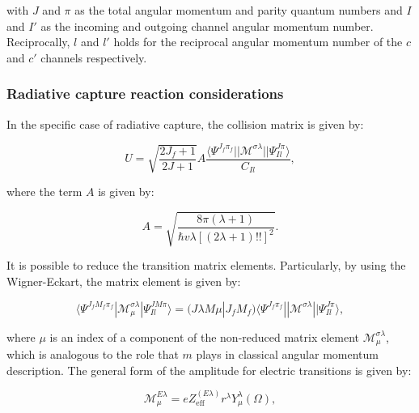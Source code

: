 \documentclass[openany]{book}
\begin{document}
with $J$ and $\pi$ as the total angular momentum and parity quantum numbers and $I$ and $I'$ as the incoming and outgoing channel angular momentum number. Reciprocally, $l$ and $l'$ holds for the reciprocal angular momentum number of the $c$ and $c'$ channels respectively.\\

\subsubsection{Radiative capture reaction considerations} \label{ssub:rmatrix_calculable_radiative_capture}

In the specific case of radiative capture, the collision matrix is given by: 

\begin{equation}\label{rmatrix_radiativeCapture_U}
	U = \sqrt{\frac{2J_f + 1}{2J + 1}} A \frac{\langle \Psi^{J_f\pi_f} || \mathcal{M}^{\sigma \lambda} ||  \Psi^{J \pi}_{Il} \rangle }{C_{Il}},
\end{equation}

where the term $A$ is given by:

\begin{equation}\label{rmatrix_radiativeCapture_A}
	A = \sqrt{\frac{8\pi(\lambda + 1)}{\hbar v \lambda [(2\lambda + 1)!!]^2}}.
\end{equation}

It is possible to reduce the transition matrix elements. Particularly, by using the Wigner-Eckart, the matrix element is given by:

\begin{equation}\label{rmatrix_radiativeCapture_transitionMatrix}
	\langle \Psi^{J_fM_f\pi_f} | \mathcal{M}^{\sigma \lambda}_\mu |  \Psi^{J M \pi}_{Il} \rangle = (J\lambda M \mu | J_fM_f) \langle \Psi^{J_f\pi_f} || \mathcal{M}^{\sigma \lambda} ||  \Psi^{J \pi}_{Il} \rangle,
\end{equation}

where $\mu$ is an index of a component of the non-reduced matrix element $\mathcal{M}^{\sigma \lambda}_{\mu}$, which is analogous to the role that $m$ plays in classical angular momentum description. The general form of the amplitude for electric transitions is given by: 

\begin{equation}\label{rmatrix_radiativeCapture_M}
	\mathcal{M}^{E\lambda}_{\mu} = eZ^{(E\lambda)}_{\mathrm{eff}} r^{\lambda} Y^{\lambda}_{\mu} (\Omega),
\end{equation}
\end{document}
